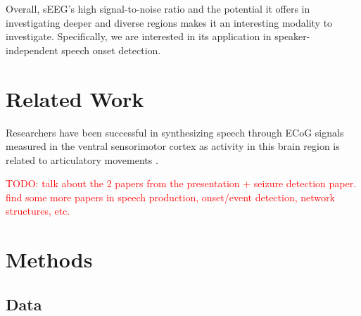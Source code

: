 \documentclass[format=sigconf, nonacm=true, review=true, screen=true]{acmart}
\newcommand{\TODO}[1]{\textcolor{red}{TODO: #1}}
\begin{document}
Overall, sEEG's high signal-to-noise ratio and the potential it offers in investigating deeper and diverse regions makes it an interesting modality to investigate. Specifically, we are interested in its application in speaker-independent speech onset detection.


\section{Related Work}

Researchers have been successful in synthesizing speech through ECoG signals measured in the ventral sensorimotor cortex as activity in this brain region is related to articulatory movements \cite{chartier2018encoding, anumanchipalli2018intelligible}.

\TODO{talk about the 2 papers from the presentation + seizure detection paper. find some more papers in speech production, onset/event detection, network structures, etc.}




\section{Methods}

\subsection{Data}
\end{document}
